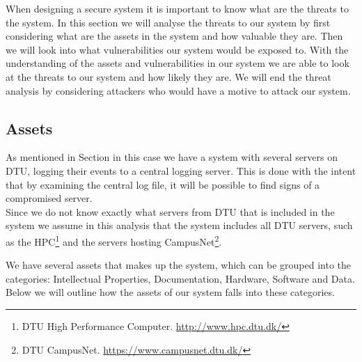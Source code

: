 \begin{comment}
on the security of log entries pre-dating the compromise of a logging machine.
Consequently, we require forward-secure stream integrity, that is, resistance
against post-compromise insertion, alteration, deletion and reordering of pre-
compromise log entries.
Traditional log integrity techniques involve using specialized write-only hard
disks or remote logging whereby copies of log entries are sent to several geo-
graphically distributed machines. With the former, disk substitution can result
in a complete integrity compromise of the entire log. In the latter, the remote
server may go offline (or become unreachable) and the logging machine then
ACM Transactions on Storage, Vol. 5, No. 1, Article 2, Publication date: March 2009.A New Approach to Secure Logging
has to locally buffer new log entries, which, in turn, become subject to attacks.
Furthermore, if the remote server is compromised, log file integrity cannot be
guaranteed.
\end{comment}

When designing a secure system it is important to know what are the threats to the system. In this section we will analyse the threats to our system by first considering what are the assets in the system and how valuable they are. Then we will look into what vulnerabilities our system would be exposed to. With the understanding of the assets and vulnerabilities in our system we are able to look at the threats to our system and how likely they are. We will end the threat analysis by considering attackers who would have a motive to attack our system.
\subsection{Assets}
As mentioned in Section  in this case we have a system with several servers on DTU, logging their events to a central logging server. This is done with the intent that by examining the central log file, it will be possible to find signs of a compromised server.\\
Since we do not know exactly what servers from DTU that is included in the system we assume in this analysis that the system includes all DTU servers, such as the HPC\footnote{DTU High Performance Computer. \url{http://www.hpc.dtu.dk/}} and the servers hosting CampusNet\footnote{DTU CampusNet. \url{https://www.campusnet.dtu.dk/}}.

We have several assets that makes up the system, which can be grouped into the categories: Intellectual Properties, Documentation, Hardware, Software and Data. Below we will outline how the assets of our system falls into these categories.


